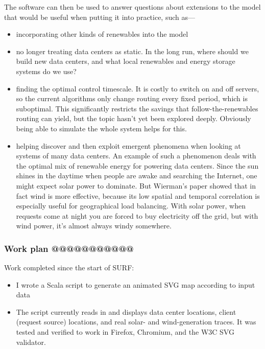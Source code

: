 \documentclass{acm_proc_article-sp}
\begin{document}
The software can then be used to answer questions about extensions to the model that would be useful when putting it into practice, such as—
\begin{itemize}
\item incorporating other kinds of renewables into the model
\item no longer treating data centers as static. In the long run, where should we build new data centers, and what local renewables and energy storage systems do we use?
\item finding the optimal control timescale. It is costly to switch on and off servers, so the current algorithms only change routing every fixed period, which is suboptimal. This significantly restricts the savings that follow-the-renewables routing can yield, but the topic hasn’t yet been explored deeply. Obviously being able to simulate the whole system helps for this.
\item helping discover and then exploit emergent phenomena when looking at systems of many data centers. An example of such a phenomenon deals with the optimal mix of renewable energy for powering data centers. Since the sun shines in the daytime when people are awake and searching the Internet, one might expect solar power to dominate. But Wierman’s paper showed that in fact wind is more effective, because its low spatial and temporal correlation is especially useful for geographical load balancing. With solar power, when requests come at night you are forced to buy electricity off the grid, but with wind power, it’s almost always windy somewhere.
\end{itemize}

\subsubsection{Work plan @@@@@@@@@@@}
Work completed since the start of SURF:
\begin{itemize}
\item I wrote a Scala script to generate an animated SVG map according to input data
\item The script currently reads in and displays data center locations, client (request source) locations, and real solar- and wind-generation traces. It was tested and verified to work in Firefox, Chromium, and the W3C SVG validator.
\end{itemize}
\end{document}
